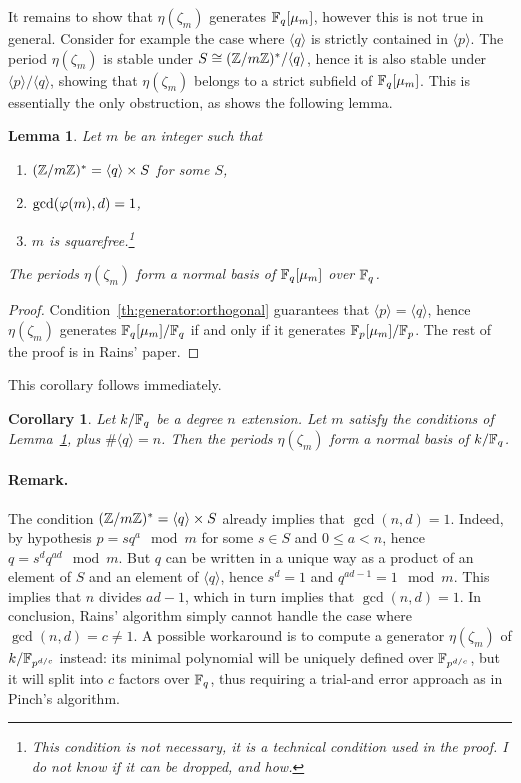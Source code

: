 \documentclass{article}
\newtheorem{Lemma}{Lemma}
\newtheorem{Coro}{Corollary}
\begin{document}
It remains to show that $\eta(\zeta_m)$ generates $\mathbb{F}_q[\mu_m]$,
however this is not true in general. Consider for example the case
where $\langle q\rangle$ is strictly contained in $\langle
p\rangle$. The period $\eta(\zeta_m)$ is stable under
$S\cong(\mathbb{Z}/m\mathbb{Z})^\ast/\langle q\rangle$, hence it is also stable under
$\langle p\rangle/\langle q\rangle$, showing that $\eta(\zeta_m)$
belongs to a strict subfield of $\mathbb{F}_q[\mu_m]$. This is essentially the
only obstruction, as shows the following lemma.

\begin{Lemma}
  \label{th:generator} Let $m$ be an integer such that
  \begin{enumerate}
  \item $(\mathbb{Z}/m\mathbb{Z})^\ast = \langle q\rangle \times S$ for some $S$,
  \item\label{th:generator:orthogonal} $\gcd(\varphi(m), d)=1$,
  \item $m$ is squarefree.\footnote{This condition is not necessary,
it is a technical condition used in the proof. I do not know if it can
be dropped, and how.}
  \end{enumerate}

  The periods $\eta(\zeta_m)$ form a normal basis of $\mathbb{F}_q[\mu_m]$
  over $\mathbb{F}_q$.
\end{Lemma}
\begin{proof}
  Condition~\ref{th:generator:orthogonal} guarantees that $\langle
  p\rangle=\langle q\rangle$, hence $\eta(\zeta_m)$ generates
  $\mathbb{F}_q[\mu_m]/\mathbb{F}_q$ if and only if it generates
  $\mathbb{F}_p[\mu_m]/\mathbb{F}_p$. The rest of the proof is in Rains' paper.
\end{proof}

This corollary follows immediately.

\begin{Coro}
  \label{th:basic-rains}
  Let $k/\mathbb{F}_q$ be a degree $n$ extension. Let $m$ satisfy the
  conditions of Lemma~\ref{th:generator}, plus $\#\langle q\rangle =
  n$.  Then the periods $\eta(\zeta_m)$ form a normal basis of
  $k/\mathbb{F}_q$.
\end{Coro}

\paragraph{Remark.} The condition $(\mathbb{Z}/m\mathbb{Z})^\ast = \langle
q\rangle\times S$ already implies that $\gcd(n,d)=1$. Indeed, by
hypothesis $p=sq^a\mod m$ for some $s\in S$ and $0\le a<n$, hence
$q=s^dq^{ad}\mod m$. But $q$ can be written in a unique way as a
product of an element of $S$ and an element of $\langle q\rangle$,
hence $s^d=1$ and $q^{ad-1}=1\mod m$. This implies that $n$ divides
$ad-1$, which in turn implies that $\gcd(n,d)=1$. In conclusion,
Rains' algorithm simply cannot handle the case where
$\gcd(n,d)=c\ne1$. A possible workaround is to compute a generator
$\eta(\zeta_m)$ of $k/\mathbb{F}_{p^{d/c}}$ instead: its minimal polynomial
will be uniquely defined over $\mathbb{F}_{p^{d/c}}$, but it will split into
$c$ factors over $\mathbb{F}_q$, thus requiring a trial-and error approach as
in Pinch's algorithm.
\end{document}
